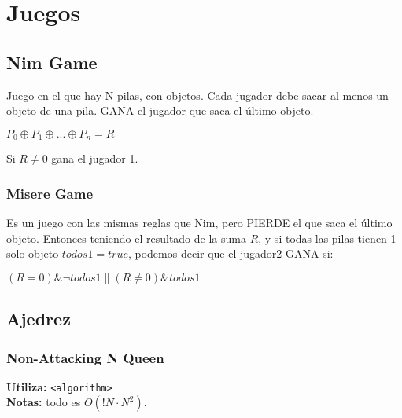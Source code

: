 \newpage
\section{Juegos}
\subsection{Nim Game}
\begin{flushleft}
Juego en el que hay N pilas, con objetos. Cada jugador debe sacar al menos un objeto de una pila. GANA el jugador que saca el \'ultimo objeto.
\end{flushleft}
$P_0{\oplus}P_1{\oplus}...{\oplus}P_n = R$
\begin{flushleft}
Si $R{\neq}0$ gana el jugador 1.
\end{flushleft}

\subsubsection{Misere Game}
\begin{flushleft}
Es un juego con las mismas reglas que Nim, pero PIERDE el que saca el \'ultimo objeto. Entonces teniendo el resultado de la suma $R$, y 
si todas las pilas tienen 1 solo objeto $todos1{=}true$, podemos decir que el jugador2 GANA si:
\end{flushleft}
${(R{=}0){\&}{\neg}{todos1}{\parallel}(R{\neq}0 ){\&}{todos1}}$
\subsection{Ajedrez}
\subsubsection{Non-Attacking N Queen}
\begin{footnotesize}
	\textbf{Utiliza:} \texttt{<algorithm>}\\
	\textbf{Notas:} todo es $ O(!N \cdot N^{2})$.
\end{footnotesize}

